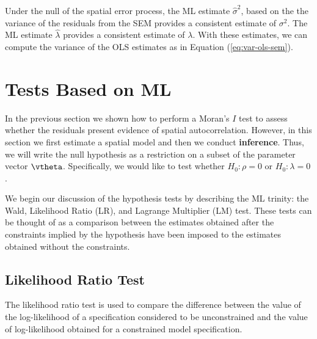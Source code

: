 \documentclass[english,12pt]{book}\usepackage[]{graphicx}\usepackage[]{xcolor}
\begin{document}
    Under the null of the spatial error process, the ML estimate $\widehat{\sigma}^2$, based on the the variance of the residuals from the SEM provides a consistent estimate of $\sigma^2$. The ML estimate $\widehat{\lambda}$ provides a consistent estimate of $\lambda$. With these estimates, we can compute the variance of the OLS estimates as in Equation (\ref{eq:var-ols-sem})\citep{pace2008spatial}.


\section{Tests Based on ML}

In the previous section we shown how to perform a Moran's $I$ test to assess whether the residuals present evidence of spatial autocorrelation. However, in this section we first estimate a spatial model and then we conduct \textbf{inference}. Thus, we will write the null hypothesis as a restriction on a subset of the parameter vector $\vtheta$. Specifically, we would like to test whether $H_0: \rho = 0$ or $H_0: \lambda = 0$.

We begin our discussion of the hypothesis tests by describing the ML trinity: the Wald, Likelihood Ratio (LR), and Lagrange Multiplier (LM) test. These tests can be thought of as a comparison between the estimates obtained after the constraints implied by the hypothesis have been imposed to the estimates obtained without the constraints.




%



\subsection{Likelihood Ratio Test}

The likelihood ratio test is used to compare the difference between the value of the log-likelihood of a specification considered to be unconstrained and the value of log-likelihood obtained for a constrained model specification.
\end{document}
